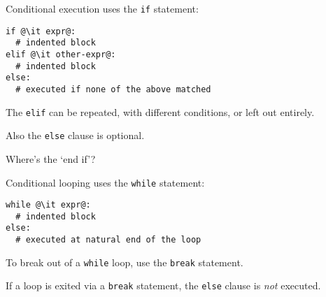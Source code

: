 \documentclass[english,serif,mathserif,xcolor=pdftex,dvipsnames,table]{beamer}
\begin{document}
\begin{frame}[fragile]
  Conditional execution uses the \texttt{if} statement:
\begin{lstlisting}
if @\it expr@:
  # indented block
elif @\it other-expr@:
  # indented block
else:
  # executed if none of the above matched
\end{lstlisting}

  \+ The \texttt{elif} can be repeated, with different conditions, or
  left out entirely.

  \+ 
  Also the \texttt{else} clause is optional.

  \+
  \begin{question}
    Where's the `end if'?

  \end{question}
\end{frame}


\begin{frame}[fragile]
  Conditional looping uses the \texttt{while} statement:
\begin{lstlisting}
while @\it expr@:
  # indented block
else:
  # executed at natural end of the loop
\end{lstlisting}

  \+
  To break out of a \texttt{while} loop, use the \texttt{break}
  statement. 

  \+
  If a loop is exited via a \texttt{break} statement, the
  \texttt{else} clause is \emph{not} executed.
\end{frame}
\end{document}
